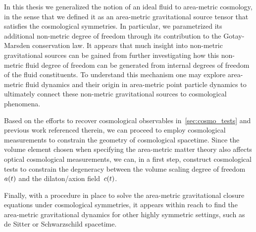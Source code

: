 In this thesis we generalized the notion of an ideal fluid to area-metric cosmology, in the sense that we defined it as an area-metric gravitational source tensor that satisfies the cosmological symmetries. In particular, we parametrized its additional non-metric degree of freedom through its contribution to the Gotay-Marsden conservation law. It appears that much insight into non-metric gravitational sources can be gained from further investigating how this non-metric fluid degree of freedom can be generated from internal degrees of freedom of the fluid constituents. To understand this mechanism one may explore area-metric fluid dynamics and their origin in area-metric point particle dynamics to ultimately connect these non-metric gravitational sources to cosmological phenomena.

Based on the efforts to recover cosmological observables in~\autoref{sec:cosmo_tests} and previous work referenced therein, we can proceed to employ cosmological measurements to constrain the geometry of cosmological spacetime. Since the volume element chosen when specifying the area-metric matter theory also affects optical cosmological measurements, we can, in a first step, construct cosmological tests to constrain the degeneracy between the volume scaling degree of freedom~$a(t)$ and the dilaton/axion field~$c(t)$.

Finally, with a procedure in place to solve the area-metric gravitational closure equations under cosmological symmetries, it appears within reach to find the area-metric gravitational dynamics for other highly symmetric  settings, such as de Sitter or Schwarzschild spacetime.



